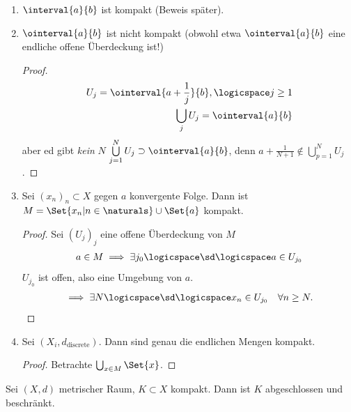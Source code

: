\begin{beispiele}
    \begin{enumerate}
        \item \( \interval{a}{b} \) ist kompakt (Beweis später).
        \item \( \ointerval{a}{b} \) ist nicht kompakt (obwohl etwa \( \ointerval{a}{b} \) eine endliche offene Überdeckung ist!)
        \begin{proof}
            \begin{align*}
                U_j=\ointerval{a+\frac{1}{j}}{b},\logicspace j\geq 1\\
                \bigcup_j U_j=\ointerval{a}{b} 
            \end{align*}
            aber ed gibt \emph{kein} \( N\) \sd
                \( \bigcup\limits_{j=1}^{N}U_j\supset \ointerval{a}{b} \), denn \zb \( a+\frac{1}{N+1}\notin \bigcup_{p=1}^{N}U_j \).  
        \end{proof}
        
        \item Sei \( (x_n)_n\subset X\) gegen \( a\) konvergente Folge. Dann ist \( M=\Set{x_n|n\in \naturals }\cup \Set{a}\) kompakt.
        \begin{proof}
            Sei \( (U_j)_j\) eine offene Überdeckung von \( M\)
            \begin{align*}
                a\in M\implies \exists j_0\logicspace\text{\sd} \logicspace a\in U_{j_0}
            \end{align*} 
            \( U_{j_0}\) ist offen, also eine Umgebung von \( a\).
            \begin{align*}
                \implies \exists N\logicspace\text{\sd} \logicspace  x_n\in U_{j_0}\quad \forall n\geq N.
            \end{align*}
        \end{proof}
        
        \item Sei \( (X_i,d_{\text{discrete}})\). Dann sind genau die endlichen Mengen kompakt.
        \begin{proof}
            Betrachte \( \bigcup_{x\in M} \Set{x}\). 
        \end{proof}        
    \end{enumerate}
\end{beispiele}
\begin{satz}\label{kompakt:abgeschlossen_beschraenkt}
    Sei \( (X,d)\) metrischer Raum, \( K\subset X\) kompakt. Dann ist \( K\) abgeschlossen und beschränkt. 
\end{satz}
